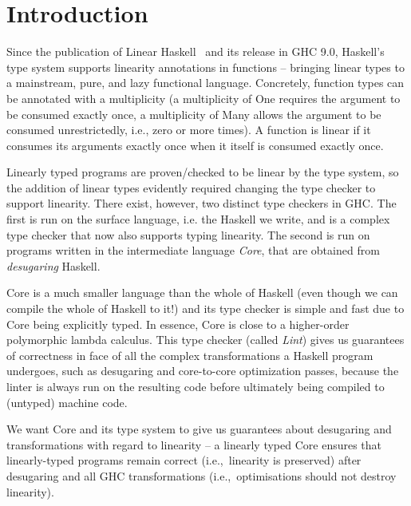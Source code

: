 \documentclass[]{lwnovathesis}
\begin{document}
\section{Introduction}


Since the publication of Linear Haskell~\cite{linearhaskell} and its release in GHC 9.0,
Haskell's type system supports linearity annotations in functions -- bringing
linear types to a mainstream, pure, and lazy functional language. Concretely,
function types can be annotated with a multiplicity (a multiplicity of One
requires the argument to be consumed exactly once, a multiplicity of Many allows
the argument to be consumed unrestrictedly, i.e., zero or more times). A
function is linear if it consumes its arguments exactly once when it itself is
consumed exactly once.

Linearly typed programs are proven/checked to be linear by the type system, so
the addition of linear types evidently required changing the type checker to
support linearity. There exist, however, two distinct type checkers in GHC.
The first is run on the surface language, i.e. the Haskell we write, and is a
complex type checker that now also supports typing linearity. The second is
run on programs written in the intermediate language \emph{Core}, that
are obtained from \emph{desugaring} Haskell.

Core is a much smaller language than the whole of Haskell (even though we
can compile the whole of Haskell to it!) and its type checker is
simple and fast due to Core being explicitly typed. In essence, Core
is close to a higher-order polymorphic lambda calculus. This type
checker (called \emph{Lint}) gives us guarantees of correctness in face of all
the complex transformations a Haskell program undergoes, such as desugaring and
core-to-core optimization passes, because the linter is always run on the resulting code
before ultimately being compiled to (untyped) machine code.


We want Core and its type system to give us guarantees about
desugaring and transformations with regard to linearity -- a linearly
typed Core ensures that linearly-typed programs remain correct
(i.e.,~linearity is preserved) after desugaring and all GHC
transformations (i.e.,~optimisations should not destroy linearity).
\end{document}
